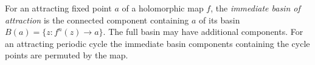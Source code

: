 
For an attracting fixed point $a$ of a holomorphic map $f$, the \emph{immediate basin of attraction} is the connected component containing $a$ of its basin $B(a)=\{z:f^n(z)\to a\}$. The full basin may have additional components. For an attracting periodic cycle the immediate basin components containing the cycle points are permuted by the map.
